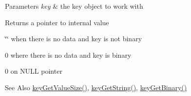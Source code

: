 \begin{DoxyParams}{Parameters}
{\em key} & the key object to work with \\
\hline
\end{DoxyParams}
\begin{DoxyReturn}{Returns}
a pointer to internal value 

\char`\"{}\char`\"{} when there is no data and key is not binary 

0 where there is no data and key is binary 

0 on N\-U\-L\-L pointer 
\end{DoxyReturn}
\begin{DoxySeeAlso}{See Also}
\hyperlink{group__keyvalue_gae326672fffb7474abfe9baf53b73217e}{key\-Get\-Value\-Size()}, \hyperlink{group__keyvalue_ga41b9fac5ccddafe407fc0ae1e2eb8778}{key\-Get\-String()}, \hyperlink{group__keyvalue_ga4c0d8a4a11174197699c231e0b5c3c84}{key\-Get\-Binary()} 
\end{DoxySeeAlso}
